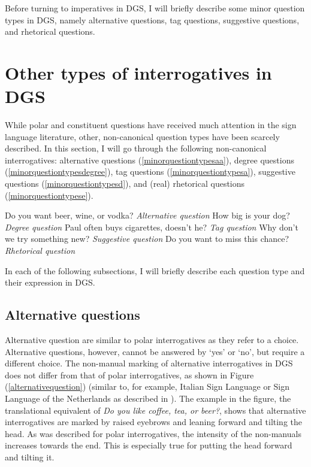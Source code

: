 Before turning to imperatives in DGS, I will briefly describe some minor question types in DGS, namely alternative questions, tag questions, suggestive questions, and rhetorical questions. 

\section{Other types of interrogatives in DGS}\label{otherinterr}
While polar and constituent questions have received much attention in the sign language literature, other, non-canonical question types have been scarcely described. In this section, I will go through the following non-canonical interrogatives: alternative questions  (\ref{minorquestiontypesaa}), degree questions (\ref{minorquestiontypesdegree}), tag questions (\ref{minorquestiontypesa}), suggestive questions (\ref{minorquestiontypesd}), and (real) rhetorical questions (\ref{minorquestiontypese}).%

\begin{exe}
\ex\label{minorquestiontypes}\begin{xlist}
\ex Do you want beer, wine, or vodka? \hfill{\textit{Alternative question}} \label{minorquestiontypesaa}
\ex How big is your dog? \hfill{\textit{Degree question}} \label{minorquestiontypesdegree}
\ex Paul often buys cigarettes, doesn't he? \hfill{\textit{Tag question}} \label{minorquestiontypesa}
\ex Why don't we try something new?  \hfill{\textit{Suggestive question}}  \label{minorquestiontypesd}
\ex Do you want to miss this chance? \hfill{\textit{Rhetorical question}} \label{minorquestiontypese}




\end{xlist}
\end{exe} 


\noindent In each of the following subsections, I will briefly describe each question type and their expression in DGS.

\subsection{Alternative questions}
Alternative question are similar to polar interrogatives as they refer to a choice. Alternative questions, however, cannot be answered by `yes' or `no', but require a different choice. The non-manual marking of alternative interrogatives in DGS does not differ from that of polar interrogatives, as shown in Figure (\ref{alternativequestion}) (similar to, for example, Italian Sign Language or Sign Language of the Netherlands as described in \citealt{brunelli2011antisymmetry}). The example in the figure, the translational equivalent of \textit{Do you like coffee, tea, or beer?}, shows that alternative interrogatives are marked by raised eyebrows and leaning forward and tilting the head. As was described for polar interrogatives, the intensity of the non-manuals increases towards the end. This is especially true for putting the head forward and tilting it.


